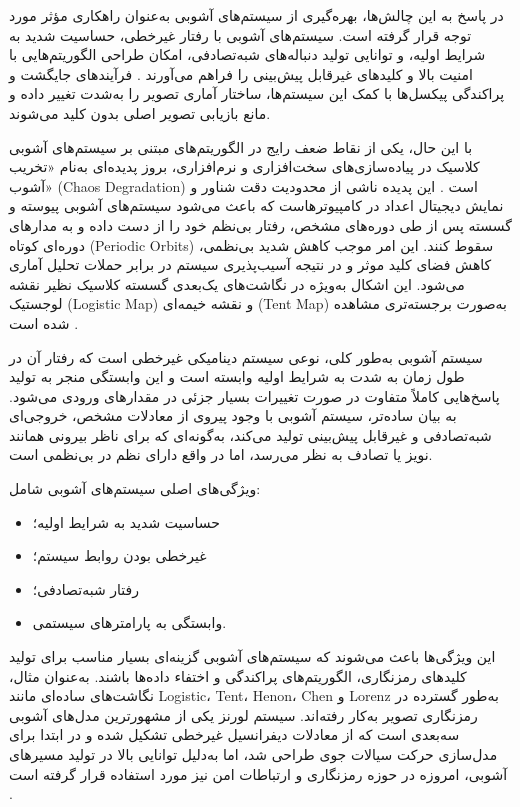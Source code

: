 در پاسخ به این چالش‌ها، بهره‌گیری از سیستم‌های آشوبی به‌عنوان راهکاری مؤثر مورد توجه قرار گرفته است. سیستم‌های آشوبی با رفتار غیرخطی، حساسیت شدید به شرایط اولیه، و توانایی تولید دنباله‌های شبه‌تصادفی، امکان طراحی الگوریتم‌هایی با امنیت بالا و کلیدهای غیرقابل پیش‌بینی را فراهم می‌آورند \cite{ref4}. فرآیندهای جایگشت و پراکندگی پیکسل‌ها با کمک این سیستم‌ها، ساختار آماری تصویر را به‌شدت تغییر داده و مانع بازیابی تصویر اصلی بدون کلید می‌شوند.

با این حال، یکی از نقاط ضعف رایج در الگوریتم‌های مبتنی بر سیستم‌های آشوبی کلاسیک در پیاده‌سازی‌های سخت‌افزاری و نرم‌افزاری، بروز پدیده‌ای به‌نام «تخریب آشوب» (‎Chaos Degradation‎) است \cite{ref5, ref19}. این پدیده ناشی از محدودیت دقت شناور و نمایش دیجیتال اعداد در کامپیوترهاست که باعث می‌شود سیستم‌های آشوبی پیوسته و گسسته پس از طی دوره‌های مشخص، رفتار بی‌نظم خود را از دست داده و به مدارهای دوره‌ای کوتاه (‎Periodic Orbits‎) سقوط کنند. این امر موجب کاهش شدید بی‌نظمی، کاهش فضای کلید موثر و در نتیجه آسیب‌پذیری سیستم در برابر حملات تحلیل آماری می‌شود. این اشکال به‌ویژه در نگاشت‌های یک‌بعدی گسسته کلاسیک نظیر نقشه لوجستیک (‎Logistic Map‎) و نقشه خیمه‌ای (‎Tent Map‎) به‌صورت برجسته‌تری مشاهده شده است \cite{ref5}.

سیستم آشوبی به‌طور کلی، نوعی سیستم دینامیکی غیرخطی است که رفتار آن در طول زمان به شدت به شرایط اولیه وابسته است و این وابستگی منجر به تولید پاسخ‌هایی کاملاً متفاوت در صورت تغییرات بسیار جزئی در مقدارهای ورودی می‌شود. به بیان ساده‌تر، سیستم آشوبی با وجود پیروی از معادلات مشخص، خروجی‌ای شبه‌تصادفی و غیرقابل پیش‌بینی تولید می‌کند، به‌گونه‌ای که برای ناظر بیرونی همانند نویز یا تصادف به نظر می‌رسد، اما در واقع دارای نظم در بی‌نظمی است.

ویژگی‌های اصلی سیستم‌های آشوبی شامل:

\begin{itemize}
    \item حساسیت شدید به شرایط اولیه؛
    \item غیرخطی بودن روابط سیستم؛
    \item رفتار شبه‌تصادفی؛
    \item وابستگی به پارامترهای سیستمی.
\end{itemize}

این ویژگی‌ها باعث می‌شوند که سیستم‌های آشوبی گزینه‌ای بسیار مناسب برای تولید کلیدهای رمزنگاری، الگوریتم‌های پراکندگی و اختفاء داده‌ها باشند. به‌عنوان مثال، نگاشت‌های ساده‌ای مانند ‎Logistic‎، ‎Tent‎، ‎Henon‎، ‎Chen‎ و ‎Lorenz‎ به‌طور گسترده در رمزنگاری تصویر به‌کار رفته‌اند. سیستم لورنز یکی از مشهورترین مدل‌های آشوبی سه‌بعدی است که از معادلات دیفرانسیل غیرخطی تشکیل شده و در ابتدا برای مدل‌سازی حرکت سیالات جوی طراحی شد، اما به‌دلیل توانایی بالا در تولید مسیرهای آشوبی، امروزه در حوزه رمزنگاری و ارتباطات امن نیز مورد استفاده قرار گرفته است \cite{ref6}.

